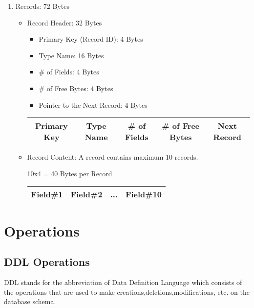 \documentclass[12pt]{article}
\begin{document}
\begin{enumerate}
        \item Records: 72 Bytes
        \begin{itemize}
            \item Record Header: 32 Bytes
            \begin{itemize}
                \item Primary Key (Record ID): 4 Bytes
                \item Type Name: 16 Bytes
                \item \# of Fields: 4 Bytes
                \item \# of Free Bytes: 4 Bytes
                \item Pointer to the Next Record: 4 Bytes
            \end{itemize}
            \begin{center}
            \begin{tabular}{|c|c|c|c|c|}
                \hline
                Primary Key & Type Name &  \# of Fields & \# of Free Bytes & Next Record \\
                \hline
            \end{tabular}
            \end{center}
            \item Record Content: A record contains maximum 10 records.
            \begin{center}
            10x4 = 40 Bytes per Record
            \end{center}
            \begin{center}
            \begin{tabular}{|c|c|c|c|}
                \hline
                Field\#1 & Field\#2 & ... & Field\#10 \\
                \hline
            \end{tabular}
            \end{center}
            
        \end{itemize}
        
    
\end{enumerate}
\clearpage

\section{\large Operations}
\subsection{DDL Operations}
DDL stands for the abbreviation of Data Definition Language which consists of the operations that are used to make creations,deletions,modifications, etc. on the database schema.
\end{document}
